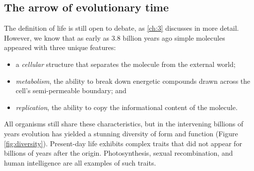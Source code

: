 \documentclass{tufte-book} %
\begin{document}
\subsection{The arrow of evolutionary time}\label{arrow-evol}


The definition of life is still open to debate, as \ref{ch:3} discusses in more detail. However, we know that as early as 3.8 billion years ago simple molecules appeared with three unique features: 

\begin{itemize}
    \item{a \emph{cellular} structure that separates the molecule from the external world;}
    \item{\emph{metabolism}, the ability to break down energetic compounds drawn across the cell’s semi-permeable boundary; and}
    \item{\emph{replication}, the ability to copy the informational content of the molecule.}
\end{itemize}


All organisms still share these characteristics, but in the intervening billions of years evolution has yielded a stunning diversity of form and function (Figure \ref{fig:diversity}). Present-day life exhibits complex traits that did not appear for billions of years after the origin. Photosynthesis, sexual recombination, and human intelligence are all examples of such traits.
\end{document}
